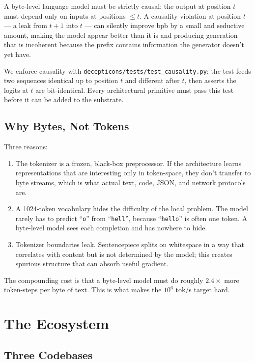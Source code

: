 \documentclass[11pt,openany]{book}
\theoremstyle{definition}
\theoremstyle{plain}
\begin{document}
A byte-level language model must be strictly causal: the output at position
$t$ must depend only on inputs at positions $\leq t$. A causality violation
at position $t$ --- a leak from $t+1$ into $t$ --- can silently improve bpb
by a small and seductive amount, making the model appear better than it
is and producing generation that is incoherent because the prefix contains
information the generator doesn't yet have.

We enforce causality with \texttt{decepticons/tests/test\_causality.py}: the
test feeds two sequences identical up to position $t$ and different after
$t$, then asserts the logits at $t$ are bit-identical. Every architectural
primitive must pass this test before it can be added to the substrate.

\section{Why Bytes, Not Tokens}

Three reasons:
\begin{enumerate}[label=\roman*.]
  \item The tokenizer is a frozen, black-box preprocessor. If the
    architecture learns representations that are interesting only in
    token-space, they don't transfer to byte streams, which is what actual
    text, code, JSON, and network protocols are.
  \item A 1024-token vocabulary hides the difficulty of the local problem.
    The model rarely has to predict ``\verb|o|'' from ``\verb|hell|'', because
    ``\verb|hello|'' is often one token. A byte-level model sees each
    completion and has nowhere to hide.
  \item Tokenizer boundaries leak. Sentencepiece splits on whitespace in a
    way that correlates with content but is not determined by the model; this
    creates spurious structure that can absorb useful gradient.
\end{enumerate}

The compounding cost is that a byte-level model must do roughly $2.4\times$
more token-steps per byte of text. This is what makes the $10^6$ tok/s
target hard.

\chapter{The Ecosystem}
\label{ch:ecosystem}

\section{Three Codebases}
\end{document}

